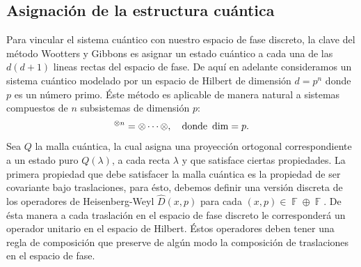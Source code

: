 \documentclass[a4paper,11pt]{report}
\DeclareMathOperator{\F}{\mathbb{F}}
\let\H\relax
\DeclareMathOperator{\H}{\mathcal H}
\begin{document}
  \subsection{Asignación de la estructura cuántica}

  Para vincular el sistema cuántico con nuestro espacio de
  fase discreto, la clave del método Wootters y Gibbons es
  asignar un estado cuántico a cada una de las $d(d+1)$
  lineas rectas del espacio de fase. De aquí en adelante
  consideramos un sistema cuántico modelado por un espacio
  de Hilbert de dimensión $d = p^{n}$ donde $p$ es un número
  primo. Éste método es aplicable de manera natural a
  sistemas compuestos de $n$ subsistemas de dimensión $p$:
  \begin{equation}
    \H^{\otimes n}
    = \H \otimes \cdots \otimes \H,
    \quad
    \text{donde } \dim\H = p.
  \end{equation}
  Sea $Q$ la malla cuántica, la cual asigna una proyección
  ortogonal correspondiente a un estado puro $Q(\lambda)$, a
  cada recta $\lambda$ y que satisface ciertas propiedades.
  La primera propiedad que debe satisfacer la malla cuántica
  es la propiedad de ser covariante bajo traslaciones, para
  ésto, debemos definir una versión discreta de los
  operadores de Heisenberg-Weyl $\hat D(x,p)$ para cada
  $(x,p) \in \F \oplus \F$. De ésta manera a cada traslación
  en el espacio de fase discreto le corresponderá un
  operador unitario en el espacio de Hilbert. Éstos
  operadores deben tener una regla de composición que
  preserve de algún modo la composición de traslaciones en
  el espacio de fase. 
\end{document}
